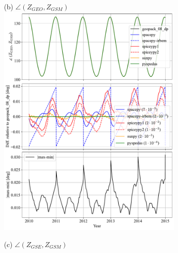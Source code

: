 \documentclass[draft]{agujournal2019}
\begin{document}
\begin{figure}[htb]
\begin{subfigure}[b]{0.49\textwidth}
         (b) $\angle (Z_{GEO}, Z_{GSM})$
         \centering
         \includegraphics[width=\textwidth]{code/figures/angles/delta=1days_20100101-20150101/GEO_GSM.pdf}
     \end{subfigure}
     \par\bigskip\bigskip
     \begin{subfigure}[b]{0.49\textwidth}
         (c) $\angle (Z_{GSE}, Z_{GSM})$
         \centering

\end{subfigure}
\end{figure}
\end{document}
